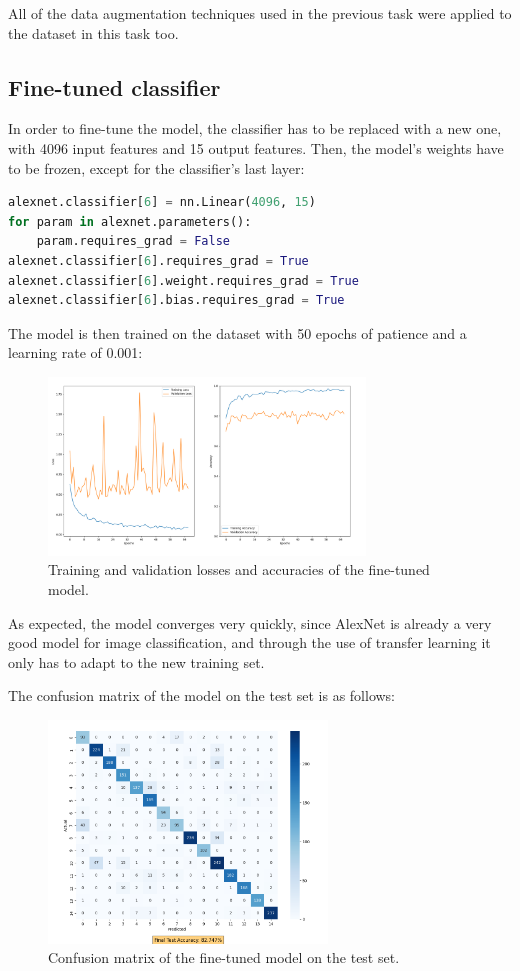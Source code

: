 \documentclass[a4paper, 11pt]{article}
\begin{document}
All of the data augmentation techniques used in the previous task were applied to the dataset in this task too.

\subsection{Fine-tuned classifier}
In order to fine-tune the model, the classifier has to be replaced with a new one, with 4096 input features and 15 output features.
Then, the model's weights have to be frozen, except for the classifier's last layer:
\begin{lstlisting}[language=Python]
alexnet.classifier[6] = nn.Linear(4096, 15)
for param in alexnet.parameters():
    param.requires_grad = False
alexnet.classifier[6].requires_grad = True
alexnet.classifier[6].weight.requires_grad = True
alexnet.classifier[6].bias.requires_grad = True
\end{lstlisting}

The model is then trained on the dataset with 50 epochs of patience and a learning rate of 0.001:
\begin{figure}[h]
    \centering
    \includegraphics[width=0.75\textwidth]{loss_and_accuracy_task_3.png}
    \caption{Training and validation losses and accuracies of the fine-tuned model.}
    \label{fig:task3_loss_accuracy}
\end{figure}

As expected, the model converges very quickly, since AlexNet is already a very good model for image classification,
and through the use of transfer learning it only has to adapt to the new training set.

\pagebreak

The confusion matrix of the model on the test set is as follows:
\begin{figure}[h]
    \centering
    \includegraphics[width=0.66\textwidth]{confusion_matrix_task_3.png}
    \caption{Confusion matrix of the fine-tuned model on the test set.}
    \label{fig:task3_confusion_matrix}
\end{figure}
\end{document}
